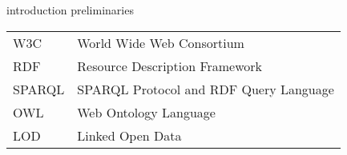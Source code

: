 \documentclass[inscr,ack]{dithesis}
\begin{document}
\frontmatter

\mainmatter


{introduction}
{preliminaries}


\backmatter

\abbreviations
\begin{center}
	\renewcommand{\arraystretch}{1.5}
	\begin{longtable}{ l @{\qquad} l }
	\toprule
  W3C    & World Wide Web Consortium \\
	RDF    & Resource Description Framework \\
	SPARQL & SPARQL Protocol and RDF Query Language \\
	OWL    & Web Ontology Language \\
  LOD    & Linked Open Data \\
	\bottomrule
	\end{longtable}
\end{center}



\end{document}
